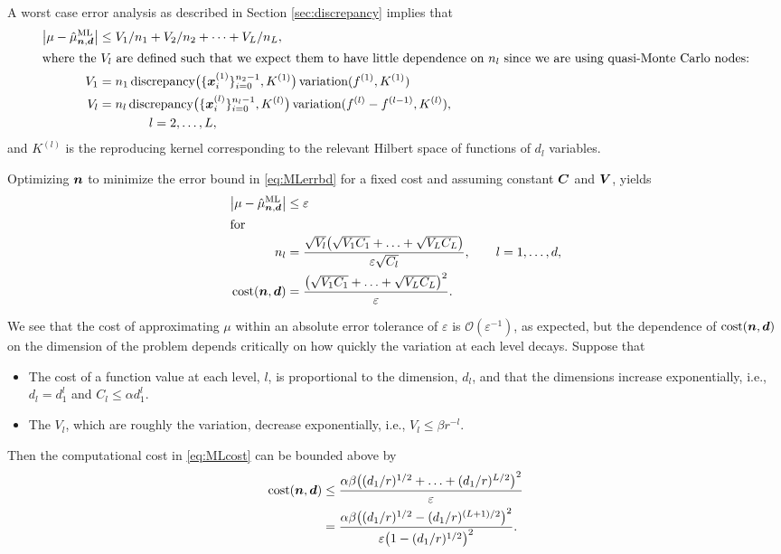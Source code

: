 \documentclass{svproc}
\begin{document}
A worst case error analysis as described in Section \ref{sec:discrepancy} implies that
\begin{align}
    \label{eq:MLerrbd}
    \bigl \lvert \mu - \hat{\mu}^{\text{ML}}_{{\boldsymbol{n}},{\boldsymbol{d}}} \bigr \rvert &\le
    V_1/n_1 + V_2/n_2 + \cdots + V_L/n_L,  \\
    \intertext{where the $V_l$ are defined such that we expect them to have little dependence on $n_l$ since we are using quasi-Monte Carlo nodes:} 
    \nonumber
    V_1 &= n_1 \, \text{discrepancy}\bigl(\{{\boldsymbol{x}}_i^{(1)}\}_{i=0}^{n_2-1}, K^{(1)} \bigr) \, \text{variation}(f^{(1)}, K^{(1)})\\
    \nonumber
    V_l & = n_l \,\text{discrepancy}\bigl(\{{\boldsymbol{x}}_i^{(l)}\}_{i=0}^{n_l-1}, K^{(l)} \bigr) \, \text{variation}(f^{(l)} - f^{(l-1)}, K^{(l)}), \\
    \nonumber
    & \qquad \qquad l = 2, \ldots, L,
\end{align}
and $K^{(l)}$ is the reproducing kernel corresponding to the relevant  Hilbert space of functions of $d_l$ variables.  

Optimizing ${\boldsymbol{n}}$ to minimize the error bound in \eqref{eq:MLerrbd} for a fixed cost and assuming constant ${\boldsymbol{C}}$ and ${\boldsymbol{V}}$, yields
\begin{align}
    \bigl \lvert \mu - \hat{\mu}^{\text{ML}}_{{\boldsymbol{n}},{\boldsymbol{d}}} \bigr \rvert &\le \varepsilon \\
\intertext{for}
    n_l & = \frac{\sqrt{V_l} \bigl(\sqrt{V_1 C_1} + \ldots + \sqrt{V_LC_L}\bigr)}{\varepsilon \sqrt{C_l} }, \qquad l = 1, \ldots, d,\\
    \text{cost}({\boldsymbol{n}},{\boldsymbol{d}}) & = \frac{\bigl(\sqrt{V_1 C_1} + \ldots + \sqrt{V_LC_L}\bigr)^2}{\varepsilon}. \label{eq:MLcost}
\end{align}

We see that the cost of approximating $\mu$ within an absolute error tolerance of $\varepsilon$ is $\mathcal{O}(\varepsilon^{-1})$, as expected, but the dependence of $\text{cost}({\boldsymbol{n}},{\boldsymbol{d}})$ on the dimension of the problem depends critically on how quickly the variation at each level decays.  Suppose that 
\begin{itemize}
    \item The cost of a function value at each level, $l$, is proportional to the dimension, $d_l$, and that the dimensions increase exponentially, i.e.,  $d_l = d_1^{l}$ and $C_l \le \alpha d_1^l$. 
    \item The $V_l$, which are roughly the variation, decrease exponentially, i.e., $V_l \le \beta r^{-l} $.
\end{itemize}   
Then the computational cost in \eqref{eq:MLcost} can be bounded above by
\begin{align*}
     \text{cost}({\boldsymbol{n}},{\boldsymbol{d}}) & \le \frac{\alpha \beta \bigl((d_1/r)^{1/2} + \ldots + (d_1/r)^{L/2}\bigr)^2}{\varepsilon} \\
     & = \frac{\alpha \beta \bigl((d_1/r)^{1/2} - (d_1/r)^{(L+1)/2}\bigr)^2}{\varepsilon \bigl( 1 - (d_1/r)^{1/2}\bigr)^2}.
\end{align*}
\end{document}
